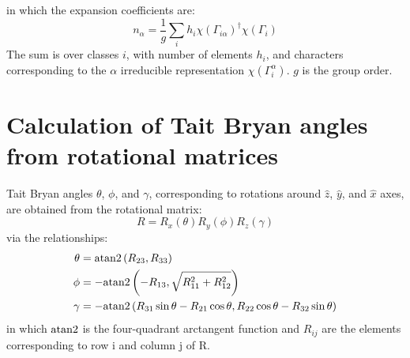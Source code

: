 \documentclass[preprint,showpacs,preprintnumbers,superscriptaddress,prb,floatfix,aps]{revtex4-1}
\begin{document}
in which the expansion coefficients are:
\begin{equation}
\label{eq:irrep_decomposition_coefficients}
n_\alpha = \frac{1}{g} \sum_i h_i \chi\left(\Gamma_{i\alpha}\right)^\dag \chi\left(\Gamma_i\right)
\end{equation}
The sum is over classes $i$, with number of elements $h_i$, and characters corresponding to the $\alpha$ irreducible representation $\chi(\Gamma_i^\alpha)$. $g$ is the group order.





\section{Calculation of Tait Bryan angles from rotational matrices}
Tait Bryan angles $\theta$, $\phi$, and $\gamma$, corresponding to rotations around $\hat{z}$, $\hat{y}$, and $\hat{x}$ axes, are obtained from the rotational matrix:
\begin{equation}
\label{eq:rotation}
R = R_x(\theta)R_y(\phi)R_z(\gamma)
\end{equation}
via the relationships:
\begin{align}
\label{eq:tait_bryan_angles}
\theta & = {\rm atan2}\left(R_{23},R_{33}\right) \\
\phi   & =-{\rm atan2}\left(-R_{13},\sqrt{R_{11}^2+R_{12}^2}\right) \\
\gamma & =-{\rm atan2}\left(R_{31}\sin{\theta}-R_{21}\cos{\theta},R_{22}\cos{\theta}-R_{32}\sin{\theta}\right)
\end{align}
in which ${\rm atan2}$ is the four-quadrant arctangent function and $R_{ij}$ are the elements corresponding to row i and column j of R. 
\end{document}
